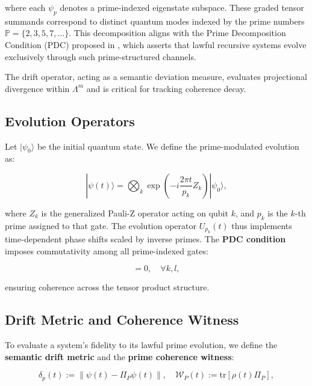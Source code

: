 \documentclass[12]{amsart}
\theoremstyle{plain}
\begin{document}
where each $\psi_p$ denotes a prime-indexed eigenstate subspace. These graded tensor summands correspond to distinct quantum modes indexed by the prime numbers $\mathbb{P} = \{2, 3, 5, 7, \dots\}$. This decomposition aligns with the Prime Decomposition Condition (PDC) proposed in \cite{meta_theorem_prime}, which asserts that lawful recursive systems evolve exclusively through such prime-structured channels.

The drift operator, acting as a semantic deviation measure, evaluates projectional divergence within $\Lambda^m$ and is critical for tracking coherence decay.

\subsection{Evolution Operators}

Let $|\psi_0\rangle$ be the initial quantum state. We define the prime-modulated evolution as:

\begin{equation}
|\psi(t)\rangle = \bigotimes_k \exp\left(-i \frac{2\pi t}{p_k} Z_k \right) |\psi_0\rangle,
\end{equation}

where $Z_k$ is the generalized Pauli-Z operator acting on qubit $k$, and $p_k$ is the $k$-th prime assigned to that gate. The evolution operator $U_{p_k}(t)$ thus implements time-dependent phase shifts scaled by inverse primes. The \textbf{PDC condition} imposes commutativity among all prime-indexed gates:

\begin{equation}
[U_{p_k}(t), U_{p_l}(t)] = 0, \quad \forall k, l,
\end{equation}

ensuring coherence across the tensor product structure.

\subsection{Drift Metric and Coherence Witness}

To evaluate a system’s fidelity to its lawful prime evolution, we define the \textbf{semantic drift metric} and the \textbf{prime coherence witness}:

\begin{equation}
\delta_p(t) := \left\| \psi(t) - \Pi_P \psi(t) \right\|, \quad \mathcal{W}_P(t) := \mathrm{tr}\left[\rho(t) \Pi_P\right],
\end{equation}
\end{document}
